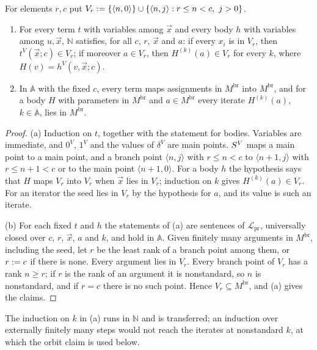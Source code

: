 \begin{lemma}[Closure]
\label{disch:lem:sc-branch-closed}
For elements $r,c$ put
$V_r\defeq\{\langle n,0\rangle\}\cup\{\langle n,j\rangle: r\le n<c,\ j>0\}$.
\begin{enumerate}[label=\textup{(\alph*)}]
\item For every term $t$ with variables among $\vec x$ and every body $h$
 with variables among $u,\vec x$, $\mathbb N$ satisfies, for all $c$, $r$,
 $\vec x$ and $a$: if every $x_i$ is in $V_r$, then $t^V(\vec x;c)\in V_r$;
 if moreover $a\in V_r$, then $H^{(k)}(a)\in V_r$ for every $k$, where
 $H(v)=h^V(v,\vec x;c)$.
\item In $\mathbb A$ with the fixed $c$, every term maps assignments in
 $M^{\mathrm{br}}$ into $M^{\mathrm{br}}$, and for a body $H$ with
 parameters in $M^{\mathrm{br}}$ and $a\in M^{\mathrm{br}}$ every iterate
 $H^{(k)}(a)$, $k\in\mathbb A$, lies in $M^{\mathrm{br}}$.
\end{enumerate}
\end{lemma}

\begin{proof}
(a) Induction on $t$, together with the statement for bodies. Variables are
immediate, and $0^V$, $1^V$ and the values of $\delta^V$ are main points.
$S^V$ maps a main point to a main point, and a branch point
$\langle n,j\rangle$ with $r\le n<c$ to $\langle n+1,j\rangle$ with
$r\le n+1<c$ or to the main point $\langle n+1,0\rangle$. For a body $h$
the hypothesis says that $H$ maps $V_r$ into $V_r$ when $\vec x$ lies in
$V_r$; induction on $k$ gives $H^{(k)}(a)\in V_r$. For an iterator the seed
lies in $V_r$ by the hypothesis for $a$, and its value is such an iterate.

(b) For each fixed $t$ and $h$ the statements of (a) are sentences of
$\mathcal L_{\mathrm{pr}}$, universally closed over $c$, $r$, $\vec x$, $a$
and $k$, and hold in $\mathbb A$. Given finitely many arguments in
$M^{\mathrm{br}}$, including the seed, let $r$ be the least rank of a branch
point among them, or $r\mathrel{:=} c$ if there is none. Every argument lies in
$V_r$. Every branch point of $V_r$ has a rank $n\ge r$; if $r$ is the rank of
an argument it is nonstandard, so $n$ is nonstandard, and if $r=c$ there is
no such point. Hence $V_r\subseteq M^{\mathrm{br}}$, and (a) gives the
claims.
\end{proof}

The induction on $k$ in (a) runs in $\mathbb N$ and is transferred; an
induction over externally finitely many steps would not reach the iterates
at nonstandard $k$, at which the orbit claim is used below.

